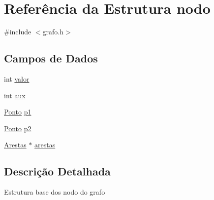 \hypertarget{structnodo}{
\section{Referência da Estrutura nodo}
\label{structnodo}
}


{\ttfamily \#include $<$grafo.h$>$}

\subsection*{Campos de Dados}
\begin{DoxyCompactItemize}
\item 
int \hyperlink{structnodo_a40424c40ee6ffe6e5624f51ac42cbd20}{valor}
\item 
int \hyperlink{structnodo_a3ab5603f2d11bf431b67ce4185d8c66a}{aux}
\item 
\hyperlink{structPonto}{Ponto} \hyperlink{structnodo_a5efde799b86ab12a2c58c2ff26a08cbd}{p1}
\item 
\hyperlink{structPonto}{Ponto} \hyperlink{structnodo_a262cf060a5438e99f5b7b9110d0ca485}{p2}
\item 
\hyperlink{structarestas}{Arestas} $\ast$ \hyperlink{structnodo_ab939c8f7188b7431d2b50414a1fb9b6a}{arestas}
\end{DoxyCompactItemize}


\subsection{Descrição Detalhada}
Estrutura base dos nodo do grafo 

